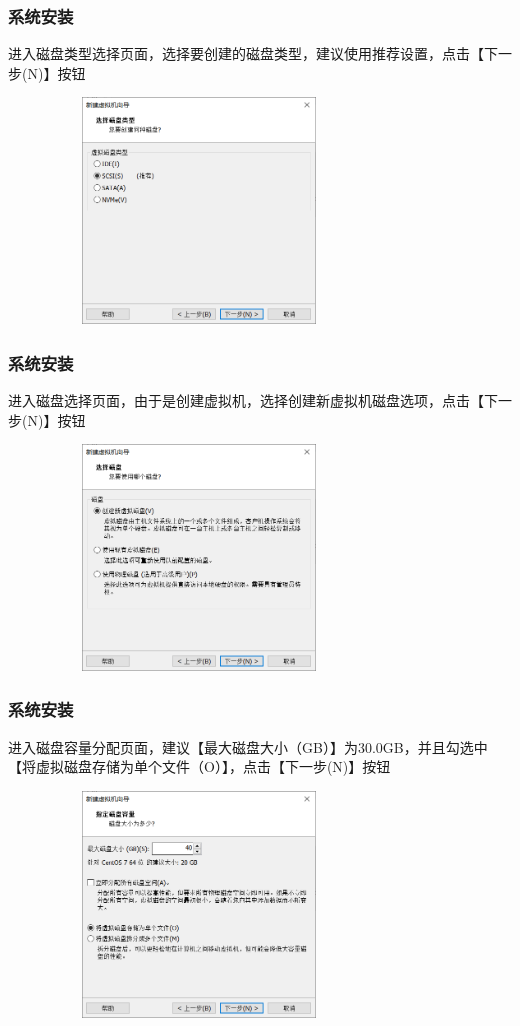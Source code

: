 \documentclass[notheorems,serif]{beamer}
\begin{document}
\begin{frame}
\frametitle{系统安装}
进入磁盘类型选择页面，选择要创建的磁盘类型，建议使用推荐设置，点击【下一步(N)】按钮
\begin{figure}
 \centering
 \includegraphics[width=8cm,height=6cm]{./figures/图片18.png}
\end{figure}
\end{frame}

\begin{frame}
\frametitle{系统安装}
进入磁盘选择页面，由于是创建虚拟机，选择创建新虚拟机磁盘选项，点击【下一步(N)】按钮
\begin{figure}
 \centering
 \includegraphics[width=8cm,height=6cm]{./figures/图片19.png}
\end{figure}
\end{frame}

\begin{frame}
\frametitle{系统安装}
进入磁盘容量分配页面，建议【最大磁盘大小（GB）】为30.0GB，并且勾选中【将虚拟磁盘存储为单个文件（O）】，点击【下一步(N)】按钮
\begin{figure}
\centering
\includegraphics[width=8cm,height=6cm]{./figures/图片20.png}
\end{figure}
\end{frame}
\end{document}
